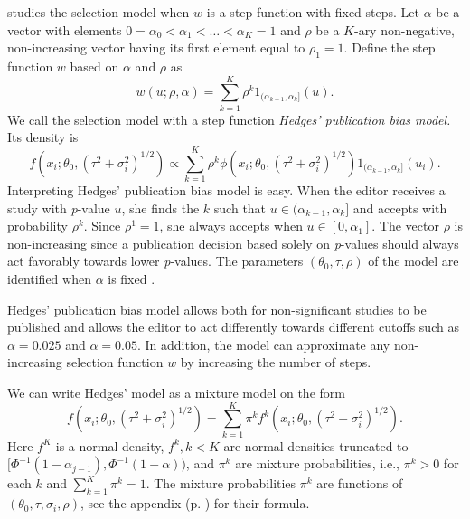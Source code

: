 \documentclass[article]{ajs}
\numberwithin{equation}{section}
\numberwithin{figure}{section}
\theoremstyle{plain}
\theoremstyle{definition}
\theoremstyle{definition}
\theoremstyle{plain}
\renewcommand{\sqrt}[1]{{(#1)^{1/2}}}
\begin{document}
\citet{hedges1992modeling} studies the selection model when $w$
is a step function with fixed steps. Let $\alpha$ be a vector with
elements $0=\alpha_{0}<\alpha_{1}<\ldots<\alpha_{K}=1$ and $\rho$
be a $K$-ary non-negative, non-increasing vector having its first
element equal to $\rho_{1}=1$. Define the step function $w$ based
on $\alpha$ and $\rho$ as
\begin{equation}
w(u;\rho,\alpha)=\sum_{k=1}^{K}\rho^{k}1_{(\alpha_{k-1},\alpha_{k}]}(u).\label{eq:step function}
\end{equation}
We call the selection model with a step function \emph{Hedges' publication
bias model. }Its density is
\begin{equation}
f(x_{i};\theta_{0},\sqrt{\tau^{2}+\sigma_{i}^{2}})\propto\sum_{k=1}^{K}\rho^{k}\phi(x_{i};\theta_{0},\sqrt{\tau^{2}+\sigma_{i}^{2}})1_{(\alpha_{k-1},\alpha_{k}]}(u_{i}).\label{eq:hedges model}
\end{equation}
Interpreting Hedges' publication bias model is easy. When the editor
receives a study with \emph{p}-value $u$, she finds the $k$ such
that $u\in(\alpha_{k-1},\alpha_{k}]$ and accepts with probability
$\rho^{k}$. Since $\rho^{1}=1$, she always accepts when $u\in[0,\alpha_{1}]$.
The vector $\rho$ is non-increasing since a publication decision
based solely on \emph{p}-values should always act favorably towards
lower \emph{p}-values. The parameters $(\theta_{0},\tau,\rho)$ of
the model are identified when $\alpha$ is fixed \citep[Web Appendix A]{moss2019modelling}.

Hedges' publication bias model allows both for non-significant studies
to be published and allows the editor to act differently towards different
cutoffs such as $\alpha=0.025$ and $\alpha=0.05$. In addition, the
model can approximate any non-increasing selection function $w$ by
increasing the number of steps.

We can write Hedges' model as a mixture model on the form
\begin{equation}
f(x_{i};\theta_{0},\sqrt{\tau^{2}+\sigma_{i}^{2}})=\sum_{k=1}^{K}\pi^{k}f^{k}(x_{i};\theta_{0},\sqrt{\tau^{2}+\sigma_{i}^{2}}).\label{eq:mixture model formulation}
\end{equation}
Here $f^{K}$ is a normal density, $f^{k},k<K$ are normal densities
truncated to $[\Phi^{-1}(1-\alpha_{j-1}),\Phi^{-1}(1-\alpha))$, and
$\pi^{k}$ are mixture probabilities, i.e., $\pi^{k}>0$ for each
$k$ and $\sum_{k=1}^{K}\pi^{k}=1$. The mixture probabilities $\pi^{k}$
are functions of $(\theta_{0},\tau,\sigma_{i},\rho)$, see the appendix
(p. \pageref{eq:pi_i formula}) for their formula.
\end{document}
